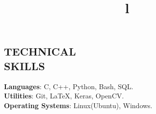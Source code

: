 \documentclass[margin]{res}
\begin{document}
\begin{resume}

\section{TECHNICAL\\SKILLS}
\textbf{Languages}: C, C++, Python,  Bash, SQL.
\\
\textbf{Utilities}:  Git, \LaTeX, Keras, OpenCV.
\\
\textbf{Operating Systems}:  Linux(Ubuntu), Windows.

\begin{format}
\title{l}\\
\\
\body\\
\end{format}


\end{resume}
\end{document}
